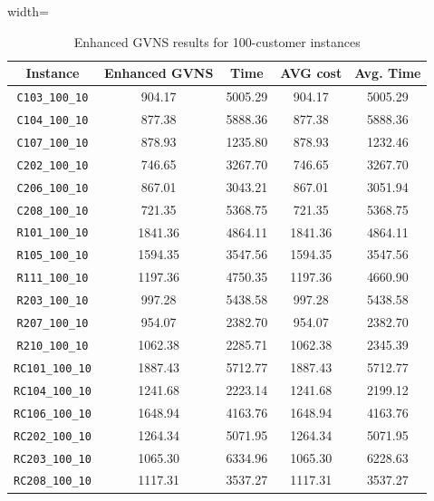 \documentclass{article}
\begin{document}
\begin{table}[h]
\centering
\small
\setlength{\tabcolsep}{4pt}
\caption{Enhanced GVNS results for 100-customer instances}
\vspace{4mm}
\begin{adjustbox}{width=\textwidth}
\begin{tabular}{c c c c c}
\toprule
Instance & Enhanced GVNS & Time & AVG cost & Avg. Time \\
\midrule
\texttt{C103\_100\_10} & 904.17 & 5005.29 & 904.17 & 5005.29 \\
\texttt{C104\_100\_10} & 877.38 & 5888.36 & 877.38 & 5888.36 \\
\texttt{C107\_100\_10} & 878.93 & 1235.80 & 878.93 & 1232.46 \\
\texttt{C202\_100\_10} & 746.65 & 3267.70 & 746.65 & 3267.70 \\
\texttt{C206\_100\_10} & 867.01 & 3043.21 & 867.01 & 3051.94 \\
\texttt{C208\_100\_10} & 721.35 & 5368.75 & 721.35 & 5368.75 \\
\texttt{R101\_100\_10} & 1841.36 & 4864.11 & 1841.36 & 4864.11 \\
\texttt{R105\_100\_10} & 1594.35 & 3547.56 & 1594.35 & 3547.56 \\
\texttt{R111\_100\_10} & 1197.36 & 4750.35 & 1197.36 & 4660.90 \\
\texttt{R203\_100\_10} & 997.28 & 5438.58 & 997.28 & 5438.58 \\
\texttt{R207\_100\_10} & 954.07 & 2382.70 & 954.07 & 2382.70 \\
\texttt{R210\_100\_10} & 1062.38 & 2285.71 & 1062.38 & 2345.39 \\
\texttt{RC101\_100\_10} & 1887.43 & 5712.77 & 1887.43 & 5712.77 \\
\texttt{RC104\_100\_10} & 1241.68 & 2223.14 & 1241.68 & 2199.12 \\
\texttt{RC106\_100\_10} & 1648.94 & 4163.76 & 1648.94 & 4163.76 \\
\texttt{RC202\_100\_10} & 1264.34 & 5071.95 & 1264.34 & 5071.95 \\
\texttt{RC203\_100\_10} & 1065.30 & 6334.96 & 1065.30 & 6228.63 \\
\texttt{RC208\_100\_10} & 1117.31 & 3537.27 & 1117.31 & 3537.27 \\
\bottomrule
\end{tabular}
\end{adjustbox}
\end{table}
\end{document}
